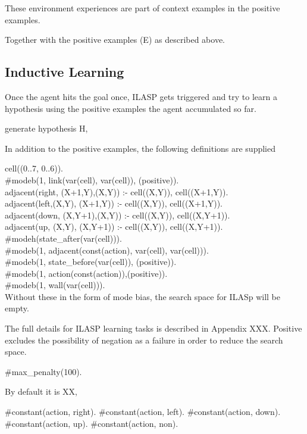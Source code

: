 These environment experiences are part of context examples in the positive examples. 

Together with the positive examples (E) as described above. 

\subsection{Inductive Learning}
\label{induction}

Once the agent hits the goal once, ILASP gets triggered and try to learn a hypothesis using the positive examples the agent accumulated so far. 

generate hypothesis H,

In addition to the positive examples, the following definitions are supplied

cell((0..7, 0..6)). \\
\#modeb(1, link(var(cell), var(cell)), (positive)). \\
adjacent(right, (X+1,Y),(X,Y))   :- cell((X,Y)), cell((X+1,Y)). \\
adjacent(left,(X,Y),  (X+1,Y)) :- cell((X,Y)), cell((X+1,Y)). \\
adjacent(down, (X,Y+1),(X,Y))   :- cell((X,Y)), cell((X,Y+1)). \\
adjacent(up,   (X,Y),  (X,Y+1)) :- cell((X,Y)), cell((X,Y+1)). \\

\#modeh(state\_after(var(cell))). \\
\#modeb(1, adjacent(const(action), var(cell), var(cell))). \\
\#modeb(1, state\_before(var(cell)), (positive)). \\
\#modeb(1, action(const(action)),(positive)). \\
\#modeb(1, wall(var(cell))). \\

Without these in the form of mode bias, the search space for ILASp will be empty. 

The full details for ILASP learning tasks is described in Appendix XXX.
Positive excludes the possibility of negation as a failure in order to reduce the search space.

\#max\_penalty(100).

By default it is XX, 

\#constant(action, right).
\#constant(action, left).
\#constant(action, down).
\#constant(action, up).
\#constant(action, non).

